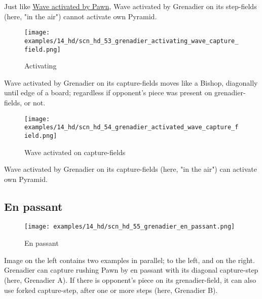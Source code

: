 \vspace*{-0.5\baselineskip}
Just like
\hyperref[fig:scn_n_17_sideways_pawn_does_not_activate_pyramid]{Wave activated by Pawn},
Wave activated by Grenadier on its step-fields (here, "in the air") cannot activate own
Pyramid.

\clearpage %

\vspace*{-2.1\baselineskip}
\noindent
\begin{wrapfigure}[5]{l}{0.4\textwidth}
\centering
\texttt{[image: examples/14\_hd/scn\_hd\_53\_grenadier\_activating\_wave\_capture\_field.png]}
\vspace*{-0.5\baselineskip}
\caption{Activating}
\label{fig:scn_hd_53_grenadier_activating_wave_capture_field}
\end{wrapfigure}
Wave activated by Grenadier on its capture-fields moves like a Bishop, diagonally until
edge of a board; regardless if opponent's piece was present on grenadier-fields, or not.

\vspace*{0.1\baselineskip}
\noindent
\begin{figure}[!h]
\texttt{[image: examples/14\_hd/scn\_hd\_54\_grenadier\_activated\_wave\_capture\_field.png]}
\vspace*{-1.4\baselineskip}
\caption{Wave activated on capture-fields}
\label{fig:scn_hd_54_grenadier_activated_wave_capture_field}
\end{figure}

\vspace*{-0.5\baselineskip}
Wave activated by Grenadier on its capture-fields (here, "in the air") can activate own
Pyramid.

\clearpage %

\subsection*{En passant}
\label{sec:Hemera's Dawn/Grenadier/En passant}

\vspace*{-1.1\baselineskip}
\noindent
\begin{wrapfigure}[10]{l}{0.4\textwidth}
\centering
\texttt{[image: examples/14\_hd/scn\_hd\_55\_grenadier\_en\_passant.png]}
\vspace*{-1.4\baselineskip}
\caption{En passant}
\label{fig:scn_hd_55_grenadier_en_passant}
\end{wrapfigure}
Image on the left contains two examples in parallel; to the left, and on the right. \newline
\indent
Grenadier can capture rushing Pawn by en passant with its diagonal capture-step (here,
Grenadier A). If there is opponent's piece on its grenadier-field, it can also use
forked capture-step, after one or more steps (here, Grenadier B).

